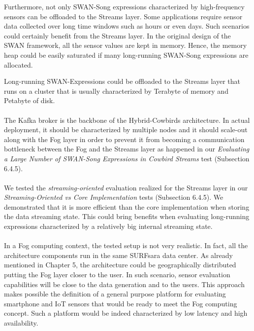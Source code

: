Furthermore, not only SWAN-Song expressions characterized by high-frequency sensors can be offloaded to the Streams layer. Some applications require sensor data collected over long time windows such as hours or even days. Such scenarios could certainly benefit from the Streams layer. In the original design of the SWAN framework, all the sensor values are kept in memory. Hence, the memory heap could be easily saturated if many long-running SWAN-Song expressions are allocated. %

Long-running SWAN-Expressions could be offloaded to the Streams layer that runs on a cluster that is usually characterized by Terabyte of memory and Petabyte of disk.  

\paragraph{}
The Kafka broker is the backbone of the Hybrid-Cowbirds architecture. In actual deployment, it should be characterized by multiple nodes and it should scale-out along with the Fog layer in order to prevent it from becoming a communication bottleneck between the Fog and the Streams layer as happened in our \emph{Evaluating a Large Number of SWAN-Song Expressions in Cowbird Streams} test (Subsection 6.4.5). 

\paragraph{}
We tested the \emph{streaming-oriented} evaluation realized for the Streams layer in our \emph{Streaming-Oriented vs Core Implementation} tests (Subsection 6.4.5). We demonstrated that it is more efficient than the core implementation when storing the data streaming state. This could bring benefits when evaluating long-running expressions characterized by a relatively big internal streaming state.

\paragraph{}
In a Fog computing context, the tested setup is not very realistic. In fact, all the architecture components run in the same SURFsara data center. As already mentioned in Chapter 5, the architecture could be geographically distributed putting the Fog layer closer to the user. In such scenario, sensor evaluation capabilities will be close to the data generation and to the users. This approach makes possible the definition of a general purpose platform for evaluating smartphone and IoT sensors that would be ready to meet the Fog computing concept. Such a platform would be indeed characterized by low latency and high availability.